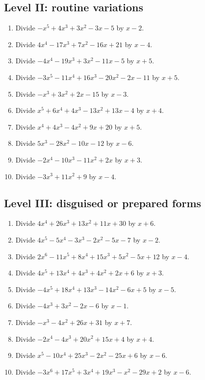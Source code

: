 \documentclass[11pt,oneside]{book}
\begin{document}
\subsection*{Level II: routine variations}
\begin{enumerate}[leftmargin=*,label=\textbf{\arabic*.},itemsep=0.65\baselineskip]
\item Divide $ - x^{5} + 4 x^{3} + 3 x^{2} - 3 x - 5 $ by $x - 2$.
\item Divide $ 4 x^{4} - 17 x^{3} + 7 x^{2} - 16 x + 21 $ by $x - 4$.
\item Divide $ - 4 x^{4} - 19 x^{3} + 3 x^{2} - 11 x - 5 $ by $x + 5$.
\item Divide $ - 3 x^{5} - 11 x^{4} + 16 x^{3} - 20 x^{2} - 2 x - 11 $ by $x + 5$.
\item Divide $ - x^{3} + 3 x^{2} + 2 x - 15 $ by $x - 3$.
\item Divide $ x^{5} + 6 x^{4} + 4 x^{3} - 13 x^{2} + 13 x - 4 $ by $x + 4$.
\item Divide $ x^{4} + 4 x^{3} - 4 x^{2} + 9 x + 20 $ by $x + 5$.
\item Divide $ 5 x^{3} - 28 x^{2} - 10 x - 12 $ by $x - 6$.
\item Divide $ - 2 x^{4} - 10 x^{3} - 11 x^{2} + 2 x $ by $x + 3$.
\item Divide $ - 3 x^{3} + 11 x^{2} + 9 $ by $x - 4$.
\end{enumerate}
\subsection*{Level III: disguised or prepared forms}
\begin{enumerate}[leftmargin=*,label=\textbf{\arabic*.},itemsep=0.65\baselineskip]
\item Divide $ 4 x^{4} + 26 x^{3} + 13 x^{2} + 11 x + 30 $ by $x + 6$.
\item Divide $ 4 x^{5} - 5 x^{4} - 3 x^{3} - 2 x^{2} - 5 x - 7 $ by $x - 2$.
\item Divide $ 2 x^{6} - 11 x^{5} + 8 x^{4} + 15 x^{3} + 5 x^{2} - 5 x + 12 $ by $x - 4$.
\item Divide $ 4 x^{5} + 13 x^{4} + 4 x^{3} + 4 x^{2} + 2 x + 6 $ by $x + 3$.
\item Divide $ - 4 x^{5} + 18 x^{4} + 13 x^{3} - 14 x^{2} - 6 x + 5 $ by $x - 5$.
\item Divide $ - 4 x^{3} + 3 x^{2} - 2 x - 6 $ by $x - 1$.
\item Divide $ - x^{3} - 4 x^{2} + 26 x + 31 $ by $x + 7$.
\item Divide $ - 2 x^{4} - 4 x^{3} + 20 x^{2} + 15 x + 4 $ by $x + 4$.
\item Divide $ x^{5} - 10 x^{4} + 25 x^{3} - 2 x^{2} - 25 x + 6 $ by $x - 6$.
\item Divide $ - 3 x^{6} + 17 x^{5} + 3 x^{4} + 19 x^{3} - x^{2} - 29 x + 2 $ by $x - 6$.
\end{enumerate}
\end{document}
